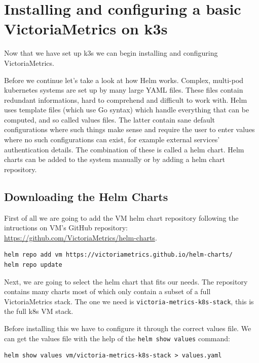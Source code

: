 
\section{Installing and configuring a basic VictoriaMetrics on k3s}

Now that we have set up k3s we can begin installing and configuring
VictoriaMetrics.

Before we continue let's take a look at how Helm works. Complex, multi-pod
kubernetes systems are set up by many large YAML files. These files contain
redundant informations, hard to comprehend and difficult to work with. Helm
uses template files (which use Go syntax) which handle everything that can be
computed, and so called values files. The latter contain sane default
configurations where such things make sense and require the user to enter
values where no such configurations can exist, for example external services'
authentication details. The combination of these is called a helm chart. Helm
charts can be added to the system manually or by adding a helm chart
repository.

\subsection{Downloading the Helm Charts}

First of all we are going to add the VM helm chart repository following the
intructions on VM's GitHub repository:
\url{https://github.com/VictoriaMetrics/helm-charts}.

\begin{lstlisting}
helm repo add vm https://victoriametrics.github.io/helm-charts/
helm repo update
\end{lstlisting}

Next, we are going to select the helm chart that fits our needs. The repository
contains many charts most of which only contain a subset of a full
VictoriaMetrics stack. The one we need is \verb+victoria-metrics-k8s-stack+,
this is the full k8s VM stack.

Before installing this we have to configure it through the correct values file.
We can get the values file with the help of the \verb+helm show values+
command:

\begin{lstlisting}
helm show values vm/victoria-metrics-k8s-stack > values.yaml
\end{lstlisting}

